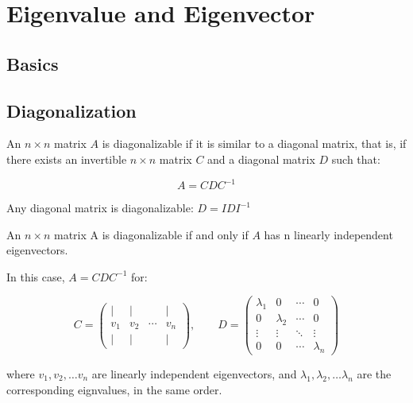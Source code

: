\chapter{Eigenvalue and Eigenvector}

\section{Basics}

% 


\section{Diagonalization}

\begin{definition}[diagonalization]
   An $n  \times n$ matrix $A$ is diagonalizable if it is similar to a diagonal matrix, that is, if there exists an invertible $n \times n$ matrix $C$ and a diagonal matrix $D$ such that:

   $$A = C D C^{-1}$$
\end{definition}

\begin{eg}
    Any diagonal matrix is diagonalizable:  $D = IDI^{-1}$    
\end{eg}

\begin{theorem}
    An $n \times n$ matrix A is diagonalizable if and only if $A$ has n linearly independent eigenvectors.

    In this case, $A = CDC^{-1}$ for:

    \[
    C = \begin{pmatrix}
        | & | &  & | \\
        v_1 & v_2 & \cdots & v_n \\
        | & | &  & | 
        \end{pmatrix},
        \qquad
    D = \begin{pmatrix}
        \lambda_1 & 0 & \cdots & 0  \\  
        0 & \lambda_2 & \cdots & 0 \\
        \vdots & \vdots & \ddots & \vdots \\
        0 & 0 & \cdots & \lambda_n 
    \end{pmatrix} 
    \]

    where $v_1, v_2, \dots v_n$  are linearly independent eigenvectors, and $\lambda_1, \lambda_2, \dots \lambda_n$ are the corresponding eignvalues, in the same order.
\end{theorem}

